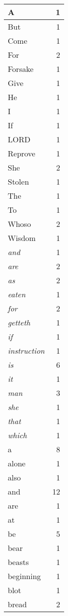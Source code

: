 \begin{center}
\begin{longtable}{l|r}
A & 1\\ \hline 
But & 1\\ \hline 
Come & 1\\ \hline 
For & 2\\ \hline 
Forsake & 1\\ \hline 
Give & 1\\ \hline 
He & 1\\ \hline 
I & 1\\ \hline 
If & 1\\ \hline 
LORD & 1\\ \hline 
Reprove & 1\\ \hline 
She & 2\\ \hline 
Stolen & 1\\ \hline 
The & 1\\ \hline 
To & 1\\ \hline 
Whoso & 2\\ \hline 
Wisdom & 1\\ \hline 
\emph{and} & 1\\ \hline 
\emph{are} & 2\\ \hline 
\emph{as} & 2\\ \hline 
\emph{eaten} & 1\\ \hline 
\emph{for} & 2\\ \hline 
\emph{getteth} & 1\\ \hline 
\emph{if} & 1\\ \hline 
\emph{instruction} & 1\\ \hline 
\emph{is} & 6\\ \hline 
\emph{it} & 1\\ \hline 
\emph{man} & 3\\ \hline 
\emph{she} & 1\\ \hline 
\emph{that} & 1\\ \hline 
\emph{which} & 1\\ \hline 
a & 8\\ \hline 
alone & 1\\ \hline 
also & 1\\ \hline 
and & 12\\ \hline 
are & 1\\ \hline 
at & 1\\ \hline 
be & 5\\ \hline 
bear & 1\\ \hline 
beasts & 1\\ \hline 
beginning & 1\\ \hline 
blot & 1\\ \hline 
bread & 2\\ \hline 

\end{longtable}
\end{center}
